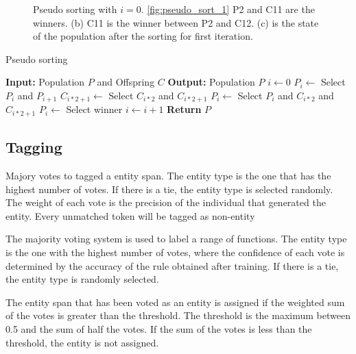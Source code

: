 \documentclass{IEEEtran}
\begin{document}
\begin{figure}[ht]
  \centering
  \subfloat[Stage 1]{
    
    \label{fig:pseudo_sort_1}
  }
  \subfloat[Stage 2]{
    
    \label{fig:pseudo_sort_2}
  }
  \subfloat[Stage 3]{
    
    \label{fig:pseudo_sort_3}
  }
  \caption{Pseudo sorting with $i=0$. \ref{fig:pseudo_sort_1} P2 and C11 are the winners. (b) C11 is the winner between P2 and C12. (c) is the state of the population after the sorting for first iteration.}
  \label{fig:pseudo_sort}
\end{figure}



\begin{algorithm}[H]
  \caption{Pseudo sorting}
  \label{alg:pseudo_sort}
  \begin{algorithmic}[1]
    \State \textbf{Input:} Population $P$ and Offspring $C$
    \State \textbf{Output:} Population $P$
    \State $i \gets 0$
    \State $P_i \gets$ Select $P_i$ and $P_{i+1}$
    \State $C_{i*2+1} \gets$ Select $C_{i*2}$ and $C_{i*2+1}$
    \State $P_i \gets$ Select $P_i$ and $C_{i*2}$ and $C_{i*2+1}$
    \State $P_i \gets$ Select winner
    \State $i \gets i + 1$
    \EndWhile
    \State \textbf{Return} $P$
  \end{algorithmic}
\end{algorithm}


\subsection{Tagging}


Majory votes to tagged a entity span. The entity type is the one that has the highest number of votes. If there is a tie, the entity type is selected randomly. The weight of each vote is the precision of the individual that generated the entity. Every  unmatched  token  will  be  tagged  as  non-entity

The majority voting system is used to label a range of functions. The entity type is the one with the highest number of votes, where the confidence of each vote is determined by the accuracy of the rule obtained after training. If there is a tie, the entity type is randomly selected.

The entity span that has been voted as an entity is assigned if the weighted sum of the votes is greater than the threshold. The threshold is the maximum between 0.5 and the sum of half the votes. If the sum of the votes is less than the threshold, the entity is not assigned.
\end{document}

